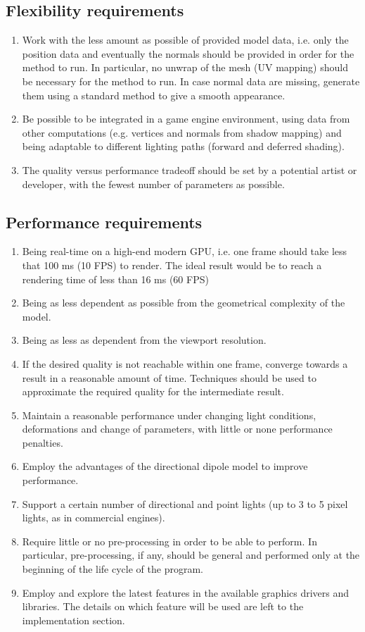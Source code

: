 \subsection{Flexibility requirements}	
\begin{enumerate}
	\item Work with the less amount as possible of provided model data, i.e. only the position data and eventually the normals should be provided in order for the method to run. In particular, no unwrap of the mesh (UV mapping) should be necessary for the method to run. In case normal data are missing, generate them using a standard method to give a smooth appearance.
	\item Be possible to be integrated in a game engine environment, using data from other computations (e.g. vertices and normals from shadow mapping) and being adaptable to different lighting paths (forward and deferred shading).
  \item The quality versus performance tradeoff should be set by a potential artist or developer, with the fewest number of parameters as possible.
\end{enumerate}

\subsection{Performance requirements}

\begin{enumerate}
	\item Being real-time on a high-end modern GPU, i.e. one frame should take less that 100 ms (10 FPS) to render. The ideal result would be to reach a rendering time of less than 16 ms (60 FPS)
	\item Being as less dependent as possible from the geometrical complexity of the model.
	\item Being as less as dependent from the viewport resolution.
	\item If the desired quality is not reachable within one frame, converge towards a result in a reasonable amount of time. Techniques should be used to approximate the required quality for the intermediate result. 
	\item Maintain a reasonable performance under changing light conditions, deformations and change of parameters, with little or none performance penalties.
	\item Employ the advantages of the directional dipole model to improve performance.
	\item Support a certain number of directional and point lights (up to 3 to 5 pixel lights, as in commercial engines\citep{unitymanual}).
	\item Require little or no pre-processing in order to be able to perform. In particular, pre-processing, if any, should be general and performed only at the beginning of the life cycle of the program. 
	\item Employ and explore the latest features in the available graphics drivers and libraries. The details on which feature will be used are left to the implementation section.
\end{enumerate}

